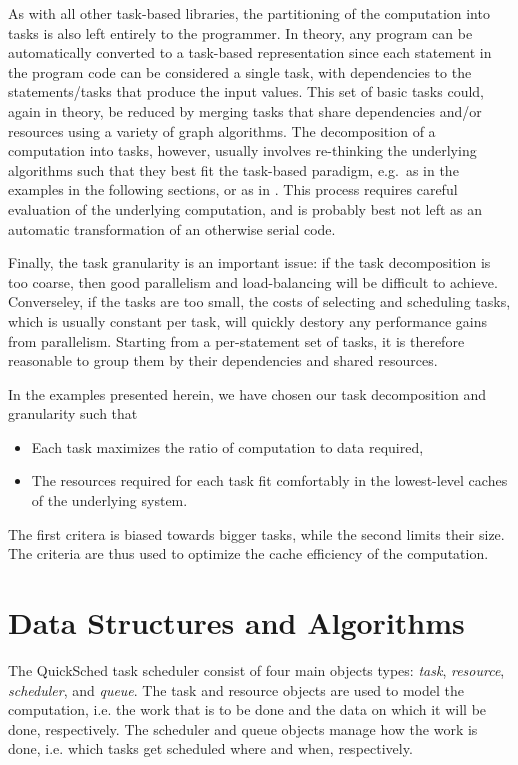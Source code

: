 \documentclass[preprint]{elsarticle}
\begin{document}
As with all other task-based libraries, the partitioning of the
computation into tasks is also left entirely to the programmer.
In theory, any program can be automatically converted to a task-based
representation since each statement in the program code
can be considered a single task, with dependencies to the
statements/tasks that produce the input values.
This set of basic tasks could, again in theory, be reduced by merging
tasks that share dependencies and/or resources using a variety
of graph algorithms.
The decomposition of a computation into tasks, however, usually
involves re-thinking the underlying algorithms such that they
best fit the task-based paradigm, e.g.~as in the examples in the
following sections, or as in \cite{ref:Gonnet2014,ref:Buttari2009,ref:Ltaief2012}.
This process requires careful evaluation of the underlying
computation, and is probably best
not left as an automatic transformation of an otherwise serial code.

Finally, the task granularity is an important issue: if the task
decomposition is too coarse, then good parallelism
and load-balancing will be difficult to achieve.
Converseley, if the tasks are too small, the costs of selecting and
scheduling tasks, which is usually constant per task, will
quickly destory any performance gains from parallelism.
Starting from a per-statement set of tasks, it is therefore
reasonable to group them by their dependencies and shared resources.

In the examples presented herein, we have chosen our task decomposition
and granularity such that
\begin{itemize}
  \item Each task maximizes the ratio of computation to data required,
  \item The resources required for each task fit comfortably in the
    lowest-level caches of the underlying system.
\end{itemize}
\noindent The first critera is biased towards bigger tasks, while the
second limits their size.
The criteria are thus used to optimize the
cache efficiency of the computation.


\section{Data Structures and Algorithms}

The QuickSched task scheduler consist of four main
objects types: {\em task}, {\em resource}, {\em scheduler},
and {\em queue}.
The task and resource objects are used
to model the computation, i.e. the work that is to be done
and the data on which it will be done, respectively.
The scheduler and queue objects manage
how the work is done, i.e. which tasks get scheduled
where and when, respectively.
\end{document}

